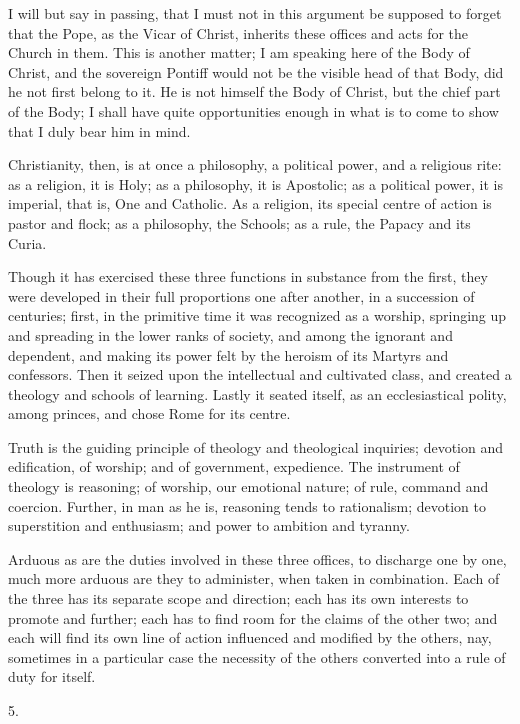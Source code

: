 I will but say in passing, that I must not in this argument be
supposed to forget that the Pope, as the Vicar of Christ, inherits
these offices and acts for the Church in them. This is another matter;
I am speaking here of the Body of Christ, and the sovereign Pontiff
would not be the visible head of that Body, did he not first belong to
it. He is not himself the Body of Christ, but the chief part of the
Body; I shall have quite opportunities enough in what is to come to
show that I duly bear him in mind.

Christianity, then, is at once a philosophy, a political power, and
a religious rite: as a religion, it is Holy; as a philosophy, it is
Apostolic; as a political power, it is imperial, that is, One and
Catholic. As a religion, its special centre of action is pastor and
flock; as a philosophy, the Schools; as a rule, the Papacy and its
Curia.

Though it has exercised these three functions in substance from the first, they were developed in their full proportions one
after another, in a succession of centuries; first, in the primitive
time it was recognized as a worship, springing up and spreading in the
lower ranks of society, and among the ignorant and dependent, and
making its power felt by the heroism of its Martyrs and confessors.
Then it seized upon the intellectual and cultivated class, and created
a theology and schools of learning. Lastly it seated itself, as an
ecclesiastical polity, among princes, and chose Rome for its centre.

Truth is the guiding principle of theology and theological
inquiries; devotion and edification, of worship; and of government,
expedience. The instrument of theology is reasoning; of worship, our
emotional nature; of rule, command and coercion. Further, in man as he
is, reasoning tends to rationalism; devotion to superstition and
enthusiasm; and power to ambition and tyranny.

Arduous as are the duties involved in these three offices, to
discharge one by one, much more arduous are they to administer, when
taken in combination. Each of the three has its separate scope and
direction; each has its own interests to promote and further; each has
to find room for the claims of the other two; and each will find its
own line of action influenced and modified by the others, nay,
sometimes in a particular case the necessity of the others converted
into a rule of duty for itself.

5.

